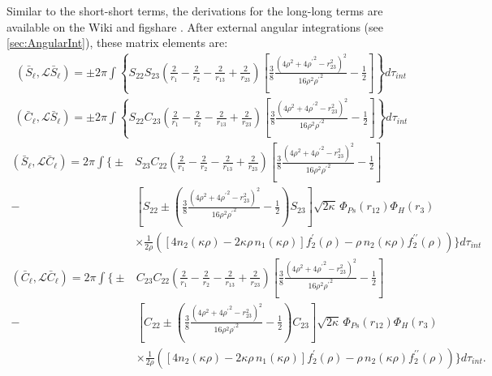 \documentclass[Dissertation.tex]{subfiles}
\begin{document}
Similar to the short-short terms, the derivations for the long-long terms are 
available on the Wiki \cite{Wiki} and figshare \cite{figshare}. After external
angular integrations (see \cref{sec:AngularInt}), these matrix elements are:
\begin{align}
\label{eq:DWaveSBarSBar}
\left(\bar{S}_\ell,\mathcal{L}\bar{S}_\ell\right) = \pm 2\pi \int \left\{ S_{22} S_{23} \left(\frac{2}{r_1} - \frac{2}{r_2} - \frac{2}{r_{13}} + \frac{2}{r_{23}} \right) \left[ \frac{3}{8} \frac{(4\rho^2 + 4 {\rho^\prime}^2 - r_{23}^2)^2}{16 \rho^2 {\rho^\prime}^2} - \frac{1}{2} \right] \right\} d\tau_{int}
\end{align}
\begin{align}
\label{eq:DWaveCBarSBar}
\left(\bar{C}_\ell,\mathcal{L}\bar{S}_\ell\right) = \pm 2\pi \int \left\{ S_{22} C_{23} \left(\frac{2}{r_1} - \frac{2}{r_2} - \frac{2}{r_{13}} + \frac{2}{r_{23}} \right) \left[ \frac{3}{8} \frac{(4\rho^2 + 4 {\rho^\prime}^2 - r_{23}^2)^2}{16 \rho^2 {\rho^\prime}^2} - \frac{1}{2} \right] \right\} d\tau_{int}
\end{align}
\begin{align}
\label{eq:DWaveSBarCBar}
\nonumber \left(\bar{S}_\ell,\mathcal{L}\bar{C}_\ell\right) = 2\pi \int \Bigg\{ \pm & S_{23} C_{22} \left(\frac{2}{r_1} - \frac{2}{r_2} - \frac{2}{r_{13}} + \frac{2}{r_{23}} \right) \left[ \frac{3}{8} \frac{(4\rho^2 + 4 {\rho^\prime}^2 - r_{23}^2)^2}{16 \rho^2 {\rho^\prime}^2} - \frac{1}{2} \right] \\
\nonumber - & \left[ S_{22} \pm \left( \frac{3}{8} \frac{(4\rho^2 + 4 {\rho^\prime}^2 - r_{23}^2)^2}{16 \rho^2 {\rho^\prime}^2} - \frac{1}{2} \right) S_{23} \right] \sqrt{2\kappa} \, \Phi_{Ps}\left(r_{12}\right) \Phi_H\left(r_3\right) \\
& \times \frac{1}{2\rho} \left( \left[ 4 n_2(\kappa\rho) - 2 \kappa\rho \, n_1(\kappa\rho) \right] f_2^\prime(\rho) - \rho \, n_2(\kappa\rho) f_2^{\prime\prime}(\rho) \right) \Bigg\} d\tau_{int}
\end{align}
\begin{align}
\label{eq:DWaveCBarCBar}
\nonumber \left(\bar{C}_\ell,\mathcal{L}\bar{C}_\ell\right) = 2\pi \int \Bigg\{ \pm & C_{23} C_{22} \left(\frac{2}{r_1} - \frac{2}{r_2} - \frac{2}{r_{13}} + \frac{2}{r_{23}} \right) \left[ \frac{3}{8} \frac{(4\rho^2 + 4 {\rho^\prime}^2 - r_{23}^2)^2}{16 \rho^2 {\rho^\prime}^2} - \frac{1}{2} \right] \\
\nonumber - & \left[ C_{22} \pm \left( \frac{3}{8} \frac{(4\rho^2 + 4 {\rho^\prime}^2 - r_{23}^2)^2}{16 \rho^2 {\rho^\prime}^2} - \frac{1}{2} \right) C_{23} \right] \sqrt{2\kappa} \, \Phi_{Ps}\left(r_{12}\right) \Phi_H\left(r_3\right) \\
& \times \frac{1}{2\rho} \left( \left[ 4 n_2(\kappa\rho) - 2 \kappa\rho \, n_1(\kappa\rho) \right] f_2^\prime(\rho) - \rho \, n_2(\kappa\rho) f_2^{\prime\prime}(\rho) \right) \Bigg\} d\tau_{int}.
\end{align}
\end{document}
